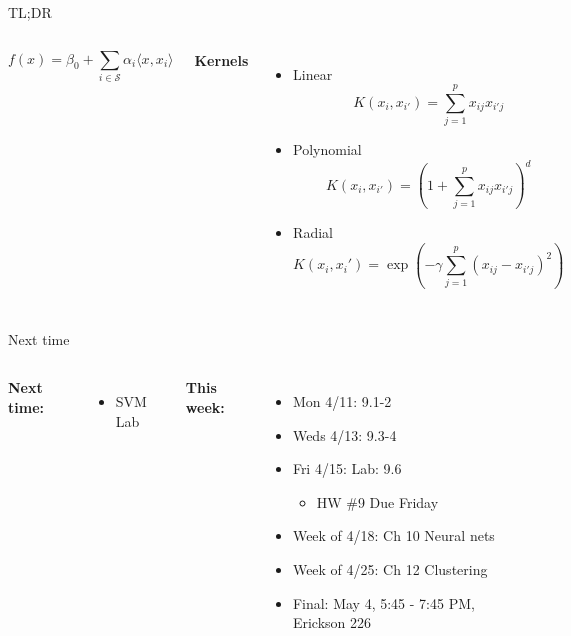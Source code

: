 \documentclass[aspectratio=169,usenames,dvipsnames]{beamer}
\begin{document}
\begin{frame}[t]{TL;DR}

\begin{columns}
\centering
\begin{equation*}
	f(x) = \beta_0 + \sum_{i \in \mathcal{S}} \alpha_i\langle x, x_i \rangle
\end{equation*}

\centering
\footnotesize
\textbf{Kernels}
\begin{itemize}
	\item Linear
\begin{equation*}
	K(x_i,x_{i'}) = \sum_{j=1}^p x_{ij}x_{i'j}
\end{equation*}
	\item Polynomial
\begin{equation*}
	K(x_i,x_{i'}) = \left(1 + \sum_{j=1}^p x_{ij}x_{i'j} \right)^d
\end{equation*}
	\item Radial
\begin{equation*}
	K(x_i,x_i') = \exp \left( -\gamma \sum_{j=1}^p(x_{ij} - x_{i'j})^2 \right)
\end{equation*}
\end{itemize}

\end{columns}

\end{frame}

\begin{frame}[t]{Next time}


\begin{columns}
\centering

\textbf{Next time:}

\begin{itemize}
	\item SVM Lab
\end{itemize}

\centering

\textbf{This week:}

	\begin{itemize}
	\item Mon 4/11: 9.1-2
	\item Weds 4/13: 9.3-4
	\item Fri 4/15: Lab: 9.6
	\begin{itemize}
		\item HW \#9 Due Friday
	\end{itemize}
	\item Week of 4/18: Ch 10 Neural nets
	\item Week of 4/25: Ch 12 Clustering
	\item Final: May 4, 5:45 - 7:45 PM, Erickson 226

	\end{itemize}
	\end{columns}

\end{frame}
\end{document}
